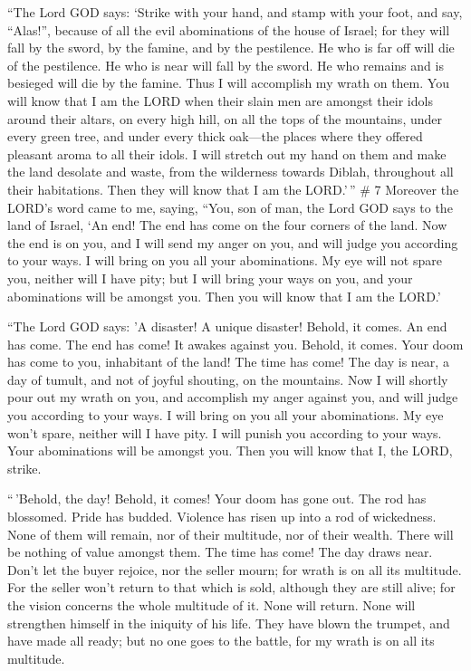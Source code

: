  ``The Lord GOD says: `Strike with your hand, and stamp
with your foot, and say, ``Alas!'', because of all the evil abominations
of the house of Israel; for they will fall by the sword, by the famine,
and by the pestilence.  He who is far off will die of the
pestilence. He who is near will fall by the sword. He who remains and is
besieged will die by the famine. Thus I will accomplish my wrath on
them.  You will know that I am the LORD when their slain
men are amongst their idols around their altars, on every high hill, on
all the tops of the mountains, under every green tree, and under every
thick oak---the places where they offered pleasant aroma to all their
idols.  I will stretch out my hand on them and make the
land desolate and waste, from the wilderness towards Diblah, throughout
all their habitations. Then they will know that I am the LORD.'\,'' \# 7
 Moreover the LORD's word came to me, saying, 
``You, son of man, the Lord GOD says to the land of Israel, `An end! The
end has come on the four corners of the land.  Now the end
is on you, and I will send my anger on you, and will judge you according
to your ways. I will bring on you all your abominations.  My
eye will not spare you, neither will I have pity; but I will bring your
ways on you, and your abominations will be amongst you. Then you will
know that I am the LORD.'

 ``The Lord GOD says: 'A disaster! A unique disaster!
Behold, it comes.  An end has come. The end has come! It
awakes against you. Behold, it comes.  Your doom has come to
you, inhabitant of the land! The time has come! The day is near, a day
of tumult, and not of joyful shouting, on the mountains. 
Now I will shortly pour out my wrath on you, and accomplish my anger
against you, and will judge you according to your ways. I will bring on
you all your abominations.  My eye won't spare, neither will
I have pity. I will punish you according to your ways. Your abominations
will be amongst you. Then you will know that I, the LORD, strike.

 ``\,'Behold, the day! Behold, it comes! Your doom has gone
out. The rod has blossomed. Pride has budded.  Violence has
risen up into a rod of wickedness. None of them will remain, nor of
their multitude, nor of their wealth. There will be nothing of value
amongst them.  The time has come! The day draws near. Don't
let the buyer rejoice, nor the seller mourn; for wrath is on all its
multitude.  For the seller won't return to that which is
sold, although they are still alive; for the vision concerns the whole
multitude of it. None will return. None will strengthen himself in the
iniquity of his life.  They have blown the trumpet, and
have made all ready; but no one goes to the battle, for my wrath is on
all its multitude.

